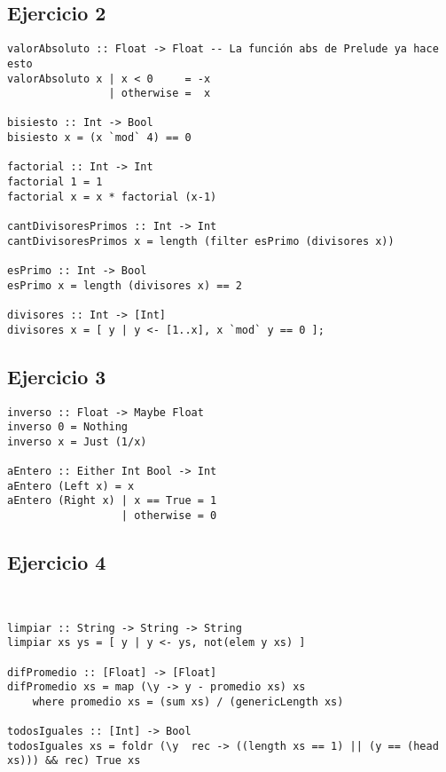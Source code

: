 \subsection{Ejercicio 2}
\begin{centrado}
\begin{verbatim}
valorAbsoluto :: Float -> Float	-- La función abs de Prelude ya hace esto
valorAbsoluto x | x < 0     = -x
                | otherwise =  x

bisiesto :: Int -> Bool
bisiesto x = (x `mod` 4) == 0

factorial :: Int -> Int
factorial 1 = 1
factorial x = x * factorial (x-1)

cantDivisoresPrimos :: Int -> Int
cantDivisoresPrimos x = length (filter esPrimo (divisores x))

esPrimo :: Int -> Bool
esPrimo x = length (divisores x) == 2

divisores :: Int -> [Int]
divisores x = [ y | y <- [1..x], x `mod` y == 0 ];

\end{verbatim}
\end{centrado}

\subsection{Ejercicio 3}
\begin{centrado}
\begin{verbatim}
inverso :: Float -> Maybe Float
inverso 0 = Nothing
inverso x = Just (1/x)

aEntero :: Either Int Bool -> Int
aEntero (Left x) = x
aEntero (Right x) | x == True = 1
                  | otherwise = 0
\end{verbatim}
\end{centrado}

\subsection{Ejercicio 4}
\begin{centrado}\
\begin{verbatim}
limpiar :: String -> String -> String
limpiar xs ys = [ y | y <- ys, not(elem y xs) ]

difPromedio :: [Float] -> [Float]
difPromedio xs = map (\y -> y - promedio xs) xs 
    where promedio xs = (sum xs) / (genericLength xs)

todosIguales :: [Int] -> Bool
todosIguales xs = foldr (\y  rec -> ((length xs == 1) || (y == (head xs))) && rec) True xs
\end{verbatim}
\end{centrado}

